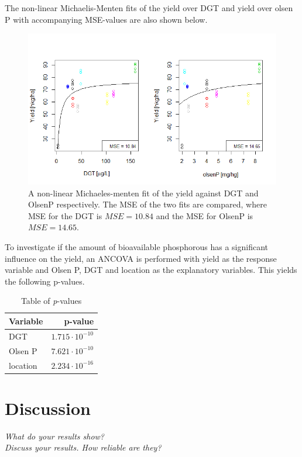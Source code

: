 \documentclass[11pt, fleqn, titlepage]{article}
\begin{document}
\noindent The non-linear Michaelis-Menten fits of the yield over DGT and yield over olsen P with accompanying MSE-values are also shown below.

\begin{figure}[H]
	\centering
	\includegraphics[width=0.7\linewidth]{billeder/non-linearfit.png}
	\caption{A non-linear Michaeles-menten fit of the yield against DGT and OlsenP respectively. The MSE of the two fits are compared, where MSE for the DGT is $ MSE = 10.84 $ and the MSE for OlsenP is $ MSE = 14.65 $.}
	\label{fig:non-linearfit}
\end{figure}

\noindent To investigate if the amount of bioavailable phosphorous has a significant influence on the yield, an ANCOVA is performed with yield as the response variable and Olsen P, DGT and location as the explanatory variables. This yields the following p-values.

\begin{table}[H]
	\centering
	\begin{tabular}{l r}
		\toprule
		Variable     & p-value                       \\ \midrule
		DGT          & $1.715 \cdot 10^{-10}$       \\ 
		Olsen P      & $7.621 \cdot 10^{-10}$         \\ 
		location     & $2.234 \cdot 10^{-16}$       \\ \bottomrule 
	\end{tabular}
	\caption{Table of \textit{p}-values}
	\label{tabel}
\end{table}

\section{Discussion}
\textit{What do your results show? \\ Discuss your results. How reliable are they?}
\end{document}
